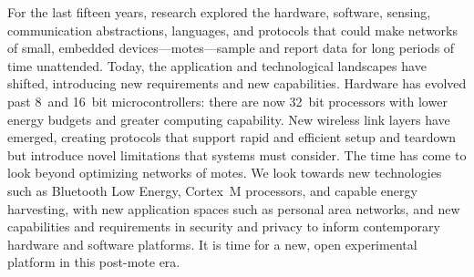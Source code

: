 
For the last fifteen years, research explored the hardware, software, sensing,
communication abstractions, languages, and protocols that could make networks
of small, embedded devices---motes---sample and report data for long periods
of time unattended.
%
Today, the
application and technological landscapes have shifted, introducing new
requirements and new capabilities. Hardware has evolved past 8~and 16~bit
microcontrollers: there are now 32~bit processors with lower energy budgets
and greater computing capability. New wireless link layers have
emerged, creating protocols that support rapid and efficient setup and
teardown but introduce novel limitations that systems must consider.
%
%
The time has come to look beyond optimizing networks of motes. We look towards
new technologies such as Bluetooth Low Energy, Cortex~M processors, and
capable energy harvesting, with new application spaces such as personal area
networks, and new capabilities and requirements in security and privacy to
inform 
contemporary
%
hardware and software platforms.  It is time for a new, open
experimental platform in this post-mote era.%

